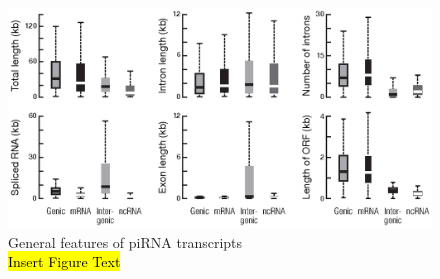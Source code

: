 \begin{figure}[htbp]
	\centering 
	\includegraphics{Figures/AppendixB/piRNAPrecusorTXFeatures.eps}
	\caption[General features of piRNA transcripts]
	{
		General features of piRNA transcripts\\
		\hl{Insert Figure Text}
	}
	\label{fig:piRNA precusor Tx features}
\end{figure}

